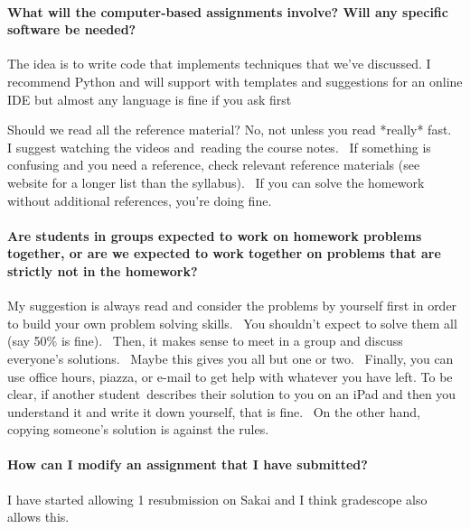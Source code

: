\documentclass[10pt,english]{article}
\begin{document}
\paragraph{What will the computer-based assignments involve? Will any specific software be needed?}

The idea is to write code that implements techniques that we've discussed.  I recommend Python and will support with templates and suggestions for an online IDE but almost any language is fine if you ask first

Should we read all the reference material?
No, not unless you read *really* fast.  I suggest watching the videos and reading the course notes.  If something is confusing and you need a reference, check relevant reference materials (see website for a longer list than the syllabus).  If you can solve the homework without additional references, you're doing fine.

\paragraph{Are students in groups expected to work on homework problems together, or are we expected to work together on problems that are strictly not in the homework?}

My suggestion is always read and consider the problems by yourself first in order to build your own problem solving skills.  You shouldn't expect to solve them all (say 50\% is fine).  Then, it makes sense to meet in a group and discuss everyone's solutions.  Maybe this gives you all but one or two.  Finally, you can use office hours, piazza, or e-mail to get help with whatever you have left.  To be clear, if another student describes their solution to you on an iPad and then you understand it and write it down yourself, that is fine.  On the other hand, copying someone's solution is against the rules.


\paragraph{How can I modify an assignment that I have submitted?}
I have started allowing 1 resubmission on Sakai and I think gradescope also allows this.


    
\end{document}
